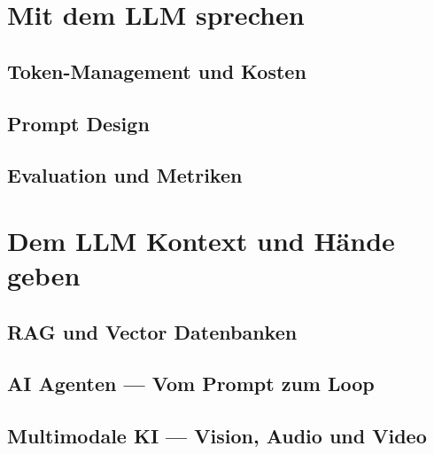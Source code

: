 \documentclass[
  12pt,
  twoside,
  openany,
  headings=big,
  numbers=noenddot,
  parskip=half,
  DIV=12
]{scrbook}
\begin{document}
\part{Mit dem LLM sprechen}

\chapter{Token-Management und Kosten}


\chapter{Prompt Design}


\chapter{Evaluation und Metriken}


\part{Dem LLM Kontext und Hände geben}

\chapter{RAG und Vector Datenbanken}


\chapter{AI Agenten --- Vom Prompt zum Loop}


\chapter{Multimodale KI --- Vision, Audio und Video}


\end{document}
